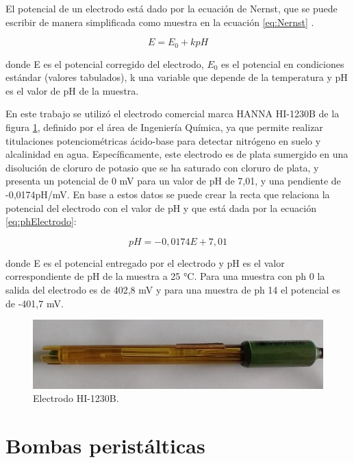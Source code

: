 
El potencial de un electrodo está dado por la ecuación de Nernst, que se puede
escribir de manera simplificada como muestra en la ecuación \ref{eq:Nernst} .

\begin{equation}
	\label{eq:Nernst}
E = E_{0} + k pH
\end{equation}
\citep{ARTICLE:4}

donde E es el potencial corregido del electrodo, $E_{0}$ es el potencial en condiciones estándar (valores tabulados), k una variable que depende de la temperatura y pH es el valor de pH de la muestra.

En este trabajo se utilizó el electrodo comercial marca HANNA HI-1230B de la figura \ref{fig:hi-1230b}, definido por el área de Ingeniería Química, ya que permite realizar titulaciones potenciométricas ácido-base para detectar nitrógeno en suelo y alcalinidad en agua. Específicamente, este electrodo es de plata sumergido en una disolución de cloruro de potasio que se ha saturado con cloruro de plata, y presenta un potencial de 0 mV para un valor de pH de 7,01, y una pendiente de -0,0174pH/mV. En base a estos datos se puede crear la recta que relaciona la potencial del electrodo con el valor de pH y que está dada por la ecuación \ref{eq:phElectrodo}:

\begin{equation}
	\label{eq:phElectrodo}
pH = -0,0174 E + 7,01
\end{equation}

donde E es el potencial entregado por el electrodo y pH es el valor correspondiente de pH de la muestra a 25 °C. Para una muestra con ph 0 la salida del electrodo es de 402,8 mV y para una muestra de ph 14 el potencial es de -401,7 mV.

\begin{figure}[htbp]
	\centering
	\includegraphics[width=.6\textwidth]{./Figures/hi-1230b.jpeg}
	\caption{Electrodo HI-1230B.}
	\label{fig:hi-1230b}
\end{figure}

\section{Bombas peristálticas}
\label{sec:bomba}

